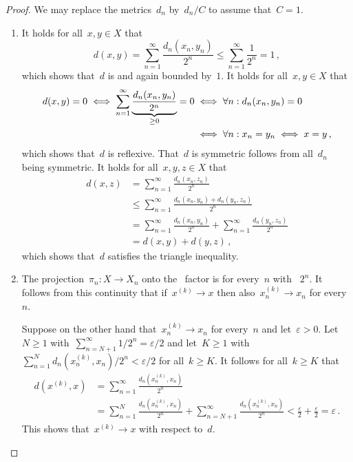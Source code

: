 \begin{proof}
  We may replace the metrics~$d_n$ by~$d_n/C$ to assume that~$C = 1$.
  \begin{enumerate}
    \item
      It holds for all~$x, y \in X$ that
      \[
              d(x,y)
        =     \sum_{n=1}^\infty \frac{d_n(x_n,y_n)}{2^n}
        \leq  \sum_{n=1}^\infty \frac{1}{2^n}
        =     1 \,,
      \]
      which shows that~$d$ is {\welldef} and again bounded by~$1$.
      It holds for all~$x, y \in X$ that
      \begin{align*}
              d(x,y) = 0
         \iff \sum_{n=1}^\infty \underbrace{\frac{d_n(x_n,y_n)}{2^n}}_{\mathclap{\geq 0}} = 0
        &\iff \forall n: d_n(x_n, y_n) = 0  \\
        &\iff \forall n: x_n = y_n
         \iff x = y \,,
      \end{align*}
      which shows that~$d$ is reflexive.
      That~$d$ is symmetric follows from all~$d_n$ being symmetric.
      It holds for all~$x, y, z \in X$ that
      \begin{align*}
              d(x,z)
        &=    \sum_{n=1}^\infty \frac{d_n(x_n,z_n)}{2^n}  \\
        &\leq \sum_{n=1}^\infty \frac{d_n(x_n,y_n) + d_n(y_n,z_n)}{2^n} \\
        &=    \sum_{n=1}^\infty \frac{d_n(x_n,y_n)}{2^n} + \sum_{n=1}^\infty \frac{d_n(y_n,z_n)}{2^n} \\
        &=    d(x,y) + d(y,z) \,,
      \end{align*}
      which shows that~$d$ satisfies the triangle inequality.
    \item
      The projection~$\pi_n \colon X \to X_n$ onto the~ factor is for every~$n$ {\lipcont} with {\lipconst}~$2^n$.
      It follows from this continuity that if~$x^{(k)} \to x$ then also~$x^{(k)}_n \to x_n$ for every~$n$.
      
      Suppose on the other hand that~$x^{(k)}_n \to x_n$ for every~$n$ and let~$\varepsilon > 0$.
      Let~$N \geq 1$ with~$\sum_{n=N+1}^\infty 1/2^n = \varepsilon/2$ and let~$K \geq 1$ with~$\sum_{n=1}^N d_n( x^{(k)}_n , x_n )/2^n < \varepsilon/2$ for all~$k \geq K$.
      It follows for all~$k \geq  K$ that
      \begin{align*}
            d(x^{(k)}, x)
        &=  \sum_{n=1}^\infty \frac{d_n(x^{(k)}_n, x_n)}{2^n} \\
        &=  \sum_{n=1}^N \frac{d_n(x^{(k)}_n, x_n)}{2^n}
            + \sum_{n=N+1}^\infty \frac{d_n(x^{(k)}_n, x_n)}{2^n}
         <  \frac{\varepsilon}{2} + \frac{\varepsilon}{2}
         =  \varepsilon \,.
      \end{align*}
      This shows that~$x^{(k)} \to x$ with respect to~$d$.
    \qedhere
  \end{enumerate}
\end{proof}




